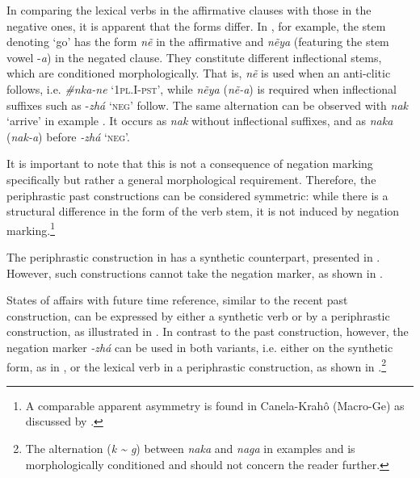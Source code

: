\documentclass[output=paper,colorlinks,citecolor=brown]{langscibook}
\begin{document}
In comparing the lexical verbs in the affirmative clauses with those in the negative ones, it is apparent that the forms differ. In , for example, the stem denoting ‘go’ has the form \textit{nẽ} in the affirmative and \textit{nẽya} (featuring the stem vowel {}-\textit{a}) in the negated clause. They constitute different inflectional stems, which are conditioned morphologically. That is, \textit{nẽ} is used when an anti{}-clitic follows, i.e. \textit{\#nka-ne} ‘\textsc{1pl.I{}-pst’,} while \textit{nẽya} (\textit{nẽ-a}) is required when inflectional suffixes such as {}-\textit{zhá} ‘\textsc{neg’} follow. The same alternation can be observed with \textit{nak} ‘arrive’ in example . It occurs as \textit{nak} without inflectional suffixes, and as \textit{naka} (\textit{nak-a}) before \textit{{}-zhá} ‘\textsc{neg’.}

It is important to note that this is not a consequence of negation marking specifically but rather a general morphological requirement. Therefore, the periphrastic past constructions can be considered symmetric: while there is a structural difference in the form of the verb stem, it is not induced by negation marking.\footnote{A comparable apparent asymmetry is found in Canela-Krahô (Macro-Ge) as discussed by \citet[69]{Miestamo2005}.}

The periphrastic construction in  has a synthetic counterpart, presented in . However, such constructions cannot take the negation marker, as shown in .

\ea\label{ex:kog:7}
    \z
\z 

States of affairs with future time reference, similar to the recent past construction, can be expressed by either a synthetic verb or by a periphrastic construction, as illustrated in . In contrast to the past construction, however, the negation marker \textit{\nobreakdash-zhá} can be used in both variants, i.e. either on the synthetic form, as in , or the lexical verb in a periphrastic construction, as shown in .\footnote{The alternation (\textit{k {\textasciitilde} g}) between \textit{naka} and \textit{naga} in examples  and  is morphologically conditioned and should not concern the reader further.}
\end{document}

